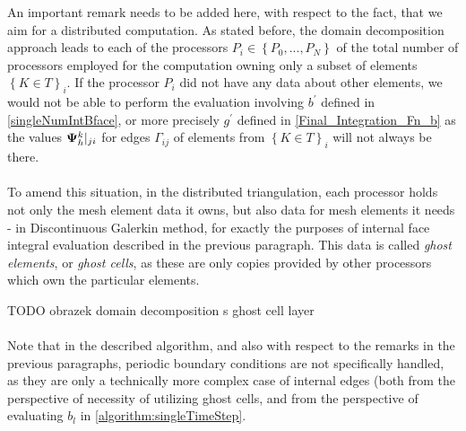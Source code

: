 An important remark needs to be added here, with respect to the fact, that we aim for a distributed computation. As stated before, the domain decomposition approach leads to each of the processors $P_i \in \left\{P_0, ..., P_N\right\}$ of the total number of processors employed for the computation owning only a subset of elements $\left\{K \in T\right\}_i$. If the processor $P_i$ did not have any data about other elements, we would not be able to perform the evaluation involving $b^{'}$ defined in \ref{singleNumIntBface}, or more precisely $g^{'}$ defined in \ref{Final_Integration_Fn_b} as the values ${\mathrm{\mathbf{\Psi}}_h^{k}}|_{ji}$ for edges $\Gamma_{ij}$ of elements from $\left\{K \in T\right\}_i$ will not always be there.
\paragraph{}
To amend this situation, in the distributed triangulation, each processor holds not only the mesh element data it owns, but also data for mesh elements it needs - in Discontinuous Galerkin method, for exactly the purposes of internal face integral evaluation described in the previous paragraph. This data is called \textit{ghost elements}, or \textit{ghost cells}, as these are only copies provided by other processors which own the particular elements.

TODO obrazek domain decomposition s ghost cell layer

\paragraph{}
Note that in the described algorithm, and also with respect to the remarks in the previous paragraphs, periodic boundary conditions are not specifically handled, as they are only a technically more complex case of internal edges (both from the perspective of necessity of utilizing ghost cells, and from the perspective of evaluating $b_{l}$ in \ref{algorithm:singleTimeStep}.